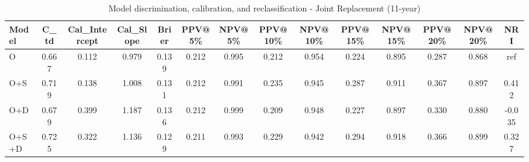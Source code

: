 \begin{table}[htbp]
\centering
\small
\caption{Model discrimination, calibration, and reclassification - Joint Replacement (11-year)}
\label{tab:perf_joint_11y}
\begin{tabular}{lccccccccccccc}
\toprule
Model & C\_td & Cal\_Intercept & Cal\_Slope & Brier & PPV@5\% & NPV@5\% & PPV@10\% & NPV@10\% & PPV@15\% & NPV@15\% & PPV@20\% & NPV@20\% & NRI \\
\midrule
O & 0.667 & 0.112 & 0.979 & 0.139 & 0.212 & 0.995 & 0.212 & 0.954 & 0.224 & 0.895 & 0.287 & 0.868 & ref \\
O+S & 0.719 & 0.138 & 1.008 & 0.131 & 0.212 & 0.991 & 0.235 & 0.945 & 0.287 & 0.911 & 0.367 & 0.897 & 0.412 \\
O+D & 0.679 & 0.399 & 1.187 & 0.136 & 0.212 & 0.999 & 0.209 & 0.948 & 0.227 & 0.897 & 0.330 & 0.880 & -0.035 \\
O+S+D & 0.725 & 0.322 & 1.136 & 0.129 & 0.211 & 0.993 & 0.229 & 0.942 & 0.294 & 0.918 & 0.366 & 0.899 & 0.327 \\
\bottomrule
\end{tabular}
\end{table}